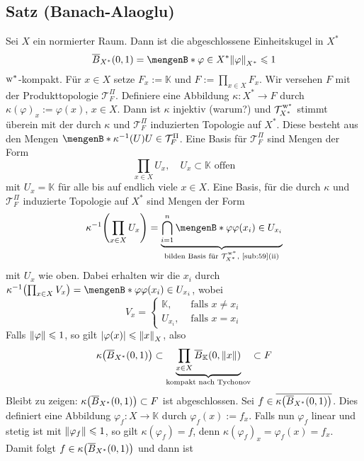\subsection{Satz (Banach-Alaoglu)} %
\label{sub:510}
Sei $X$ ein normierter Raum. Dann ist die abgeschlossene Einheitskugel in $X^*$
\[
	\overline{B}_{X^*}(0,1) = \set[\varphi \in X^*]{\norm[X^*]{\varphi} \le 1}  
\]
$\mathrm{w}^*$-kompakt.
Für $x \in X$ setze $F_x := \mathds{K}$ und $F := \prod_{x \in X} F_x$. Wir versehen $F$ mit der Produkttopologie $\mathcal{T}_F^\Pi$. Definiere eine Abbildung
$\kappa \colon X^* \to F$ durch $\kappa(\varphi)_x := \varphi(x)$, $x \in X$. Dann ist $\kappa$ injektiv (warum?) und $\weakTstar{X^*}$ stimmt überein mit der durch $\kappa$ und
$\mathcal{T}_F^\Pi$ induzierten Topologie auf $X^*$. Diese besteht aus den Mengen $\set[\kappa ^{-1}(U)]{U \in \mathcal{T}_F^\Pi}$. Eine Basis für $\mathcal{T}_F^\Pi$ sind
Mengen der Form 
\begin{equation*}
	\prod_{x \in X} U_x, \quad U_x \subset \mathds{K} \text{ offen} 
\end{equation*}
mit $U_x = \mathds{K}$ für alle bis auf endlich viele $x \in X$. Eine Basis, für die durch
$\kappa$ und $\mathcal{T}_F^\Pi$ induzierte Topologie auf $X^*$ sind Mengen der Form
\[
	\kappa ^{-1} \enbrace*{ \prod_{x \in X} U_x} = \underbrace{\bigcap_{i=1}^n \set[\varphi]{\varphi(x_i) \in U_{x_i}} }_{
	\mbox{\scriptsize bilden Basis für $\weakTstar{X^*}$, \ref{sub:59}(ii)}}
\]
mit $U_x$ wie oben. Dabei erhalten wir die $x_i$ durch $\kappa ^{-1} \enbrace*{\prod_{x \in X} V_x} = \set[\varphi]{\varphi(x_i)\in U_{x_i}}$, wobei 
\[
	V_x = \begin{cases}
		\mathds{K}, &\text{ falls } x \not= x_i\\
		U_{x_i}, &\text{ falls } x=x_i
	\end{cases}
\]
Falls $\norm{\varphi} \le 1$, so gilt $\abs*{\varphi(x)} \le \norm[X]{x}$, also 
\[
	\kappa \enbrace*{\overline{B}_{X^*}(0,1)} \subset \underbrace{\prod_{x \in X} \overline{B}_{\mathds{K}}(0, \norm{x})}_{\text{kompakt nach Tychonov}} \subset F
\]
Bleibt zu zeigen: $\kappa \enbrace*{\overline{B}_{X^*}(0,1)} \subset F$ ist abgeschlossen. Sei $f \in \overline{\kappa \enbrace*{\overline{B}_{X^*}(0,1)}}$. Dies definiert
eine Abbildung $\varphi_f \colon X \to \mathds{K}$ durch $\varphi_f(x) := f_x$. Falls nun $\varphi_f$ linear und stetig ist mit $\norm{\varphi_f} \le 1$, so gilt
$\kappa(\varphi_f) = f$, denn $\kappa(\varphi_f)_x = \varphi_f(x) = f_x$. Damit folgt $f \in \kappa \enbrace*{ \overline{B}_{X^*}(0,1)}$ und dann ist
